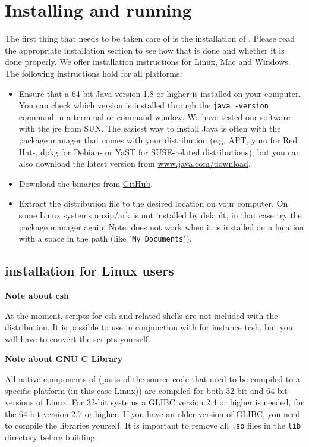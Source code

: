 \section{Installing and running \oda}\label{sec:installation}
The first thing that needs to be taken care of is the installation of \oda. Please read the appropriate installation section to see how that is done and whether it is done properly. We offer installation instructions for Linux, Mac and Windows. The following instructions hold for all platforms: 
\begin{itemize}
\item Ensure that a 64-bit Java version 1.8 or higher is installed on your computer. You can check which version is installed through the \verb|java -version| command in a terminal or command window. We have tested our software with the jre from SUN. The easiest way to install Java is often with the package manager that comes with your distribution (e.g. APT, yum for Red Hat-, dpkg for Debian- or YaST for SUSE-related distributions), but you can also download the latest version from \href{http://www.java.com/download}{www.java.com/download}.
\item Download the \oda binaries from \href{https://github.com/OpenDA-Association/OpenDA/releases}{GitHub}. 
\item Extract the \oda distribution file to the desired location on your computer. On some Linux systems unzip/ark is not installed by default, in that case try the package manager again.  Note: \oda does not work when it is installed on a location with a space in the path (like "\verb|My Documents|").
\end{itemize}

\subsection{\oda installation for Linux users}
\textbf{Note about csh}

At the moment, scripts for csh and related shells are not included with the \oda distribution. It is possible to use \oda in conjunction with for instance tcsh, but you will have to convert the scripts yourself.

\textbf{Note about GNU C Library}

All native components of \oda (parts of the source code that need to be compiled to a specific platform (in this case Linux)) are compiled for both 32-bit and 64-bit versions of Linux. For 32-bit systems a GLIBC version 2.4 or higher is needed, for the 64-bit version 2.7 or higher. If you have an older version of GLIBC, you need to compile the libraries yourself. It is important to remove all \verb|.so| files in the \verb|lib| directory before building. 

